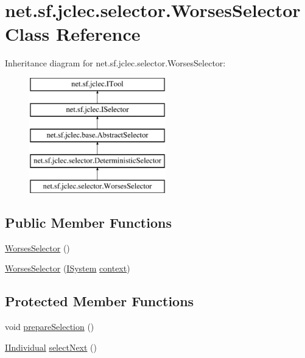 \hypertarget{classnet_1_1sf_1_1jclec_1_1selector_1_1_worses_selector}{\section{net.\-sf.\-jclec.\-selector.\-Worses\-Selector Class Reference}
\label{classnet_1_1sf_1_1jclec_1_1selector_1_1_worses_selector}
}
Inheritance diagram for net.\-sf.\-jclec.\-selector.\-Worses\-Selector\-:\begin{figure}[H]
\begin{center}
\leavevmode
\includegraphics[height=5.000000cm]{classnet_1_1sf_1_1jclec_1_1selector_1_1_worses_selector}
\end{center}
\end{figure}
\subsection*{Public Member Functions}
\begin{DoxyCompactItemize}
\item 
\hyperlink{classnet_1_1sf_1_1jclec_1_1selector_1_1_worses_selector_ae90e9ed1bb98dff24369f715a4d3bc27}{Worses\-Selector} ()
\item 
\hyperlink{classnet_1_1sf_1_1jclec_1_1selector_1_1_worses_selector_aad247bbd157f2adc786a44f7ac7d85df}{Worses\-Selector} (\hyperlink{interfacenet_1_1sf_1_1jclec_1_1_i_system}{I\-System} \hyperlink{classnet_1_1sf_1_1jclec_1_1base_1_1_abstract_selector_a4304fe5c27aa7631dc91678d22473b94}{context})
\end{DoxyCompactItemize}
\subsection*{Protected Member Functions}
\begin{DoxyCompactItemize}
\item 
void \hyperlink{classnet_1_1sf_1_1jclec_1_1selector_1_1_worses_selector_a826fea71513580a0fcbf2b9fca7782f6}{prepare\-Selection} ()
\item 
\hyperlink{interfacenet_1_1sf_1_1jclec_1_1_i_individual}{I\-Individual} \hyperlink{classnet_1_1sf_1_1jclec_1_1selector_1_1_worses_selector_a11a1329db7f422cc0a3e3292a6ed46a1}{select\-Next} ()
\end{DoxyCompactItemize}
